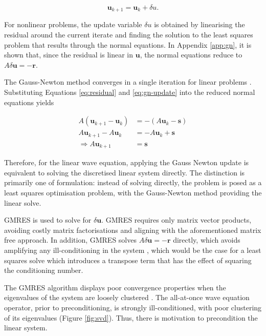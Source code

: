 \documentclass[final-report]{report-template}
\begin{document}
\begin{equation}
    \mathbf{u}_{k+1} = \mathbf{u}_{k} + \delta u.
    \label{eq:gn-update}
\end{equation} 

For nonlinear problems, the update variable $\delta u$ is obtained by linearising the residual around the current iterate and finding the solution to the least squares problem that results through the normal equations. In Appendix \ref{app:gn}, it is shown that, since the residual is linear in $\mathbf{u}$, the normal equations reduce to $A \delta \mathbf{u} = -\mathbf{r}$. 

The Gauss-Newton method converges in a single iteration for linear problems \cite{greenbaum3ErrorBounds1997}. Substituting Equations \ref{eq:residual} and \ref{eq:gn-update} into the reduced normal equations yields

\begin{align}
    A(\mathbf{u}_{k+1} - \mathbf{u}_k) &= -(A\mathbf{u}_k - \mathbf{s})\\
    A\mathbf{u}_{k+1} - A\mathbf{u}_k &= -A\mathbf{u}_k + \mathbf{s}\\
    \Rightarrow A\mathbf{u}_{k+1} &= \mathbf{s}
\end{align}

Therefore, for the linear wave equation, applying the Gauss Newton update is equivalent to solving the discretised linear system directly. The distinction is primarily one of formulation: instead of solving directly, the problem is posed as a least squares optimisation problem, with the Gauss-Newton method providing the linear solve.

GMRES is used to solve for $\delta \mathbf{u}$. GMRES \cite{gmres} requires only matrix vector products, avoiding costly matrix factorisations and aligning with the aforementioned matrix free approach. In addition, GMRES solves $A \delta \mathbf{u} = -\mathbf{r}$ directly, which avoids amplifying any ill-conditioning in the system , which would be the case for a least squares solve which introduces a transpose term that has the effect of squaring the conditioning number. 

The GMRES algorithm displays poor convergence properties when the eigenvalues of the system are loosely clustered \cite{trefethenChapterIIIConditioning1997}. The all-at-once wave equation operator, prior to preconditioning, is strongly ill-conditioned, with poor clustering of its eigenvalues (Figure \ref{fig:svd}). Thus, there is motivation to precondition the linear system.
\end{document}
